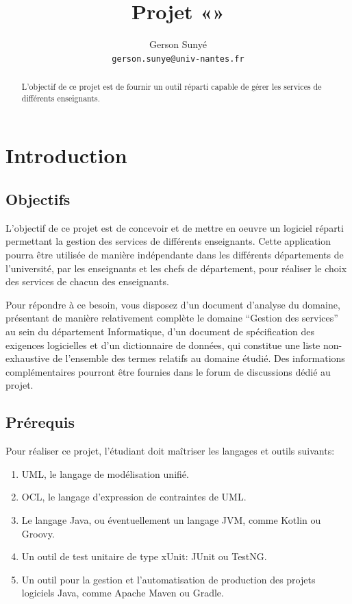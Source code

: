 \documentclass[a4]{report}
\title{Projet «\projet»}
\author{Gerson Sunyé\\
\texttt{gerson.sunye@univ-nantes.fr}}
\begin{document}
\maketitle
{}

\begin{abstract}
L’objectif de ce projet  est de fournir un outil réparti capable de gérer les services de différents enseignants.
\end{abstract}


\tableofcontents


\chapter{Introduction}
\section{Objectifs}
L’objectif de ce projet est de concevoir et de mettre en oeuvre un logiciel réparti permettant la gestion des services de différents enseignants.
Cette application pourra être utilisée de manière indépendante dans les différents départements de l’université, par les enseignants et les chefs de département, pour réaliser le choix des services de chacun des enseignants.

Pour répondre à ce besoin, vous disposez d'un document d'analyse du domaine, présentant de manière relativement complète le domaine “Gestion des services” au sein du département Informatique, d'un document de spécification des exigences logicielles et d'un dictionnaire de données, qui constitue une liste non-exhaustive de l’ensemble des termes relatifs au domaine étudié.
Des informations complémentaires pourront être fournies dans le forum de discussions dédié au projet.



\section{Prérequis}

Pour réaliser ce projet, l'étudiant doit maîtriser les langages et outils suivants:
\begin{enumerate}
	\item UML, le langage de modélisation unifié.
	\item OCL, le langage d'expression de contraintes de UML.
	\item Le langage Java, ou éventuellement  un langage JVM, comme Kotlin ou Groovy.
	\item Un outil de test unitaire de type xUnit: JUnit ou TestNG.
	\item Un outil pour la gestion et l'automatisation de production des projets logiciels Java, comme Apache Maven ou Gradle.
\end{enumerate}
\end{document}
